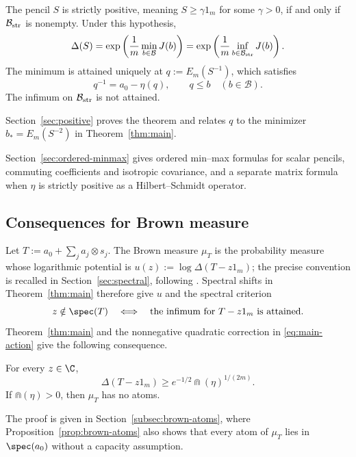 \begin{theorem}\label{thm:positive}
The pencil $S$ is strictly positive, meaning $S\ge\gamma1_m$ for some $\gamma>0$, if and only if $\mathcal B_{\rm str}$ is nonempty.
Under this hypothesis,
\begin{equation}\label{eq:positive-minimum}
 \Delta(S)=\exp\left(\frac1m\min_{b\in\mathcal B}J(b)\right)
          =\exp\left(\frac1m\inf_{b\in\mathcal B_{\rm str}}J(b)\right).
\end{equation}
The minimum is attained uniquely at $q:=E_m(S^{-1})$, which satisfies
\[
 q^{-1}=a_0-\eta(q),\qquad q\le b\quad(b\in\mathcal B).
\]
The infimum on $\mathcal B_{\rm str}$ is not attained.
\end{theorem}
Section~\ref{sec:positive} proves the theorem and relates $q$ to the minimizer $b_*=E_m(S^{-2})$ in Theorem~\ref{thm:main}.

Section~\ref{sec:ordered-minmax} gives ordered min--max formulas for scalar pencils, commuting coefficients and isotropic covariance, and a separate matrix formula when $\eta$ is strictly positive as a Hilbert--Schmidt operator.

\subsection{Consequences for Brown measure}
Let $T:=a_0+\sum_j a_j\otimes s_j$.
The Brown measure $\mu_T$ is the probability measure whose logarithmic potential is $u(z):=\log\Delta(T-z1_m)$; the precise convention is recalled in Section~\ref{sec:spectral}, following \cite[Chapter 11, Section 9]{MS17}.
Spectral shifts in Theorem~\ref{thm:main} therefore give $u$ and the spectral criterion
\[
 z\notin\spec(T)
 \quad\Longleftrightarrow\quad
 \text{the infimum for $T-z1_m$ is attained}.
\]
Theorem~\ref{thm:main} and the nonnegative quadratic correction in \eqref{eq:main-action} give the following consequence.

\begin{corollary}\label{cor:brown-capacity}
For every $z\in\C$,
\begin{equation}\label{eq:intro-uniform-bound}
 \Delta(T-z1_m)\ge e^{-1/2}\Cap(\eta)^{1/(2m)}.
\end{equation}
If $\Cap(\eta)>0$, then $\mu_T$ has no atoms.
\end{corollary}
The proof is given in Section~\ref{subsec:brown-atoms}, where Proposition~\ref{prop:brown-atoms} also shows that every atom of $\mu_T$ lies in $\spec(a_0)$ without a capacity assumption.

